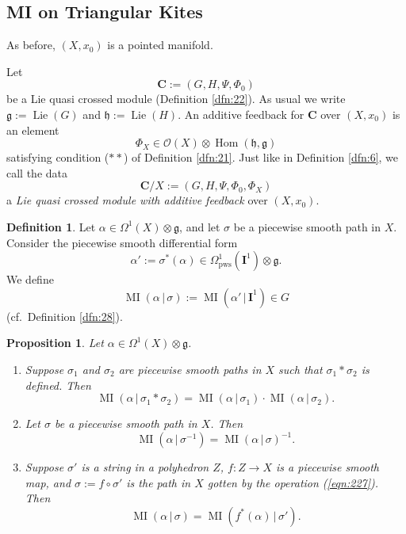 \documentclass[10pt, a4paper]{amsart}
\newtheorem{prop}[equation]{Proposition}
\theoremstyle{definition}
\newtheorem{dfn}[equation]{Definition}
\numberwithin{equation}{section}
\newcommand{\opn}{\operatorname}
\newcommand{\mfrak}[1]{\mathfrak{#1}}
\newcommand{\mcal}[1]{\mathcal{#1}}
\newcommand{\mbf}[1]{\mathbf{#1}}
\newcommand{\mrm}[1]{\mathrm{#1}}
\newcommand{\tup}[1]{\textup{#1}}
\renewcommand{\vert}{\, | \,}
\newcommand{\g}{\mfrak{g}}
\newcommand{\h}{\mfrak{h}}
\begin{document}
\subsection{MI on Triangular Kites}
As before, $(X, x_0)$ is a pointed manifold.

Let
\[ \mbf{C} := (G, H, \Psi, \Phi_0) \]
be a Lie quasi crossed module (Definition \ref{dfn:22}). As usual we write
$\g := \opn{Lie}(G)$ and $\h := \opn{Lie}(H)$. 
An additive feedback for 
$\mbf{C}$ over $(X, x_0)$ is an element
\[ \Phi_X \in \mcal{O}(X) \otimes \opn{Hom}(\h, \g) \]
satisfying condition ($**$) of Definition \ref{dfn:21}.
Just like in Definition \ref{dfn:6}, we call the data 
\[ \mbf{C} / X := (G, H, \Psi, \Phi_0, \Phi_X) \]
a {\em Lie quasi crossed module with additive feedback} over $(X, x_0)$.

\begin{dfn}
Let $\alpha \in \Omega^1(X) \otimes \g$, and let $\sigma$ be a piecewise smooth
path in $X$.
Consider the piecewise smooth differential form
\[ \alpha' := \sigma^*(\alpha) \in 
\Omega^1_{\mrm{pws}}(\mbf{I}^1) \otimes \g . \]
We define
\[ \opn{MI}(\alpha \vert \sigma) := 
\opn{MI}(\alpha' \vert \mbf{I}^1) \in G  \]
(cf.\ Definition \ref{dfn:28}).
\end{dfn}

\begin{prop} \label{prop:23}
Let $\alpha \in \Omega^1(X) \otimes \g$.
\begin{enumerate}
\item Suppose $\sigma_1$ and $\sigma_2$ are piecewise smooth paths in $X$ such
that 
$\sigma_1 * \sigma_2$ is defined. Then
\[ \opn{MI}(\alpha \vert \sigma_1 * \sigma_2) = 
\opn{MI}(\alpha \vert \sigma_1) \cdot \opn{MI}(\alpha \vert \sigma_2) . \]

\item Let $\sigma$ be a piecewise smooth path in $X$. Then
\[ \opn{MI}(\alpha \vert \sigma^{-1}) = \opn{MI}(\alpha \vert \sigma)^{-1} . \]

\item Suppose $\sigma'$ is a string in a polyhedron $Z$, $f : Z \to X$ is a
piecewise smooth map, and 
$\sigma := f \circ \sigma'$ is the path in $X$ gotten by the operation
\tup{(\ref{eqn:227})}. Then
\[ \opn{MI}(\alpha \vert \sigma) = 
\opn{MI}(f^*(\alpha) \vert \sigma') . \]
\end{enumerate}
\end{prop}
\end{document}
